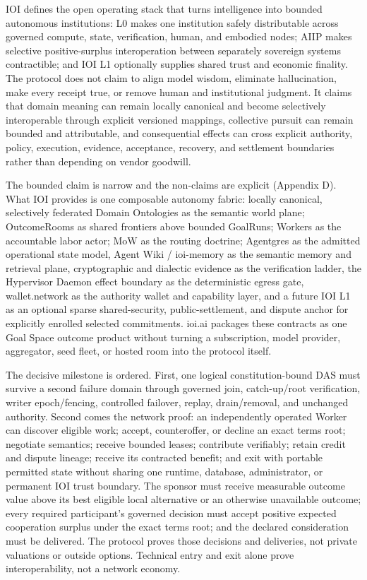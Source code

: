 \documentclass[
  11pt,
]{article}
\begin{document}
IOI defines the open operating stack that turns intelligence into bounded
autonomous institutions: L0 makes one institution safely distributable across
governed compute, state, verification, human, and embodied nodes; AIIP makes
selective positive-surplus interoperation between separately sovereign systems
contractible; and IOI L1 optionally supplies shared trust and economic finality.
The protocol does
not claim to align model wisdom, eliminate hallucination, make every
receipt true, or remove human and institutional judgment. It claims that
domain meaning can remain locally canonical and become selectively interoperable
through explicit versioned mappings, collective pursuit can remain bounded and
attributable, and consequential effects can cross explicit authority, policy,
execution, evidence, acceptance, recovery, and settlement boundaries rather
than depending on vendor goodwill.

The bounded claim is narrow and the non-claims are explicit (Appendix
D). What IOI provides is one composable autonomy fabric: locally canonical,
selectively federated Domain Ontologies as the semantic world plane; OutcomeRooms as shared
frontiers above bounded GoalRuns; Workers as the accountable labor actor;
MoW as the routing doctrine; Agentgres as the admitted operational state model,
Agent Wiki / ioi-memory as the semantic memory and retrieval plane,
cryptographic and dialectic evidence as the verification ladder, the
Hypervisor Daemon effect boundary as the deterministic egress gate,
wallet.network as the authority wallet and capability layer, and a future
IOI L1 as an optional sparse shared-security, public-settlement, and dispute
anchor for explicitly enrolled selected commitments. ioi.ai packages these contracts as one Goal Space outcome
product without turning a subscription, model provider, aggregator,
seed fleet, or hosted room into the protocol itself.

The decisive milestone is ordered. First, one logical constitution-bound DAS
must survive a second failure domain through governed join, catch-up/root
verification, writer epoch/fencing, controlled failover, replay, drain/removal,
and unchanged authority. Second comes the network proof: an independently
operated Worker can discover eligible work; accept, counteroffer, or decline an
exact terms root; negotiate semantics; receive bounded leases; contribute
verifiably; retain credit and dispute lineage; receive its contracted benefit;
and exit with portable permitted state without sharing one runtime, database,
administrator, or permanent IOI trust boundary. The sponsor must receive
measurable outcome value above its best eligible local alternative or an
otherwise unavailable outcome; every required participant's governed decision
must accept positive expected cooperation surplus under the exact terms root;
and the declared
consideration must be delivered. The protocol proves those decisions and
deliveries, not private valuations or outside options. Technical entry and exit
alone prove interoperability, not a network economy.
\end{document}
